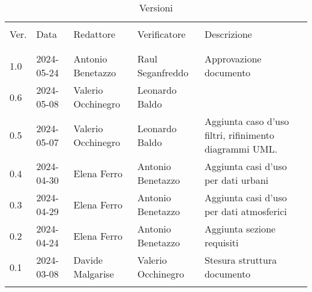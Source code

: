 \documentclass[12pt]{article}
\begin{document}


\newpage



\captionsetup[table]{list=no}
\begin{table}[!h]
	\footnotesize
	\begin{center}
		\caption*{Versioni}
		\vspace{0.5cm}
		\begin{tabular}{ l l l l p{6.1cm} }
			\hline                                                                                                          \\[-2ex]
			Ver. & Data       & Redattore     & Verificatore       & Descrizione                                            \\
			\\[-2ex] \hline \\[-1.5ex]
			1.0 & 2024-05-24  & Antonio Benetazzo & Raul Seganfreddo & Approvazione documento                          \\
			0.6  & 2024-05-08 & Valerio Occhinegro   & Leonardo Baldo &                           \\
			0.5  & 2024-05-07 & Valerio Occhinegro   & Leonardo Baldo                   & Aggiunta caso d'uso filtri, rifinimento diagrammi UML. \\
			0.4  & 2024-04-30 & Elena Ferro  		 &  Antonio Benetazzo                  & Aggiunta casi d'uso per dati urbani                    \\
			0.3  & 2024-04-29 & Elena Ferro   		 &  Antonio Benetazzo                  & Aggiunta casi d'uso per dati atmosferici               \\
			0.2  & 2024-04-24 & Elena Ferro   		 &  Antonio Benetazzo                  & Aggiunta sezione requisiti                          \\
			0.1  & 2024-03-08 & Davide Malgarise 	&   Valerio Occhinegro                 & Stesura struttura documento                          \\
			\\[-1.5ex] \hline
		\end{tabular}
	\end{center}
\end{table}
\captionsetup[table]{list=yes}

\newpage

\tableofcontents
\listoftables
\listoffigures

\newpage








\end{document}
